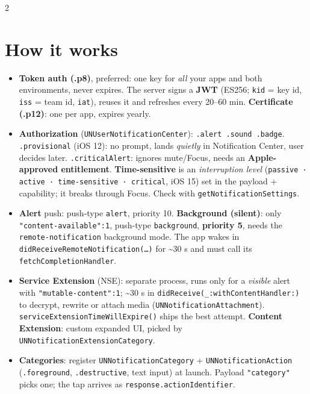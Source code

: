 \documentclass[8pt]{extarticle}
\begin{document}
\begin{multicols}{2}
\raggedright

\section{How it works}
\begin{itemize}
  \item \textbf{Token auth (.p8)}, preferred: one key for \emph{all} your
        apps and both environments, never expires. The server signs a
        \textbf{JWT} (ES256; \texttt{kid} = key id, \texttt{iss} = team id,
        \texttt{iat}), reuses it and refreshes every 20--60 min.
        \textbf{Certificate (.p12)}: one per app, expires yearly.
  \item \textbf{Authorization} (\texttt{UNUserNotificationCenter}):
        \texttt{.alert .sound .badge}. \texttt{.provisional} (iOS 12): no
        prompt, lands \emph{quietly} in Notification Center, user decides
        later. \texttt{.criticalAlert}: ignores mute/Focus, needs an
        \textbf{Apple-approved entitlement}. \textbf{Time-sensitive} is an
        \emph{interruption level} (\texttt{passive · active · time-sensitive
        · critical}, iOS 15) set in the payload + capability; it breaks
        through Focus. Check with \texttt{getNotificationSettings}.
  \item \textbf{Alert} push: push-type \texttt{alert}, priority 10.
        \textbf{Background (silent)}: only \texttt{"content-available":1},
        push-type \texttt{background}, \textbf{priority 5}, needs the
        \texttt{remote-notification} background mode. The app wakes in
        \texttt{didReceiveRemoteNotification(\dots)} for \textasciitilde30 s
        and must call its \texttt{fetchCompletionHandler}.
  \item \textbf{Service Extension} (NSE): separate process, runs only for a
        \emph{visible} alert with \texttt{"mutable-content":1}; \textasciitilde30 s in
        \texttt{didReceive(\_:withContentHandler:)} to decrypt, rewrite or attach
        media (\texttt{UNNotificationAttachment}).
        \texttt{serviceExtensionTimeWillExpire()} ships the best attempt.
        \textbf{Content Extension}: custom expanded UI, picked by
        \texttt{UNNotificationExtensionCategory}.
  \item \textbf{Categories}: register \texttt{UNNotificationCategory} +
        \texttt{UNNotificationAction} (\texttt{.foreground},
        \texttt{.destructive}, text input) at launch. Payload
        \texttt{"category"} picks one; the tap arrives as
        \texttt{response.actionIdentifier}.
\end{itemize}


\end{multicols}
\end{document}
